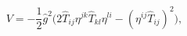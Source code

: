 \begin{equation}
V=-\frac{1}{2}\hat g^2\Bigr(2\hat T_{ij}\eta^{jk}\hat T_{kl}\eta^{li}
-(\eta^{ij}\hat T_{ij})^2\Bigr),
\end{equation}

